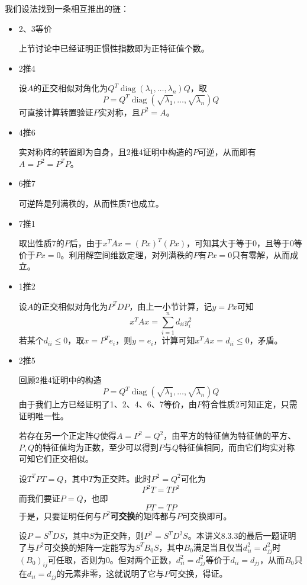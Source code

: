 \documentclass[a4paper,UTF8,fontset=windows]{ctexart}
\DeclareMathOperator{\diag}{diag}
\begin{document}
我们设法找到一条相互推出的链：
\begin{itemize}
    \item 2、3等价
    
    上节讨论中已经证明正惯性指数即为正特征值个数。

    \item 2推4
    
    设$A$的正交相似对角化为$Q^T\diag(\lambda_1,\dots,\lambda_n)Q$，取
    $$P=Q^T\diag(\sqrt{\lambda_1},\dots,\sqrt{\lambda_n})Q$$
    可直接计算转置验证$P$实对称，且$P^2=A$。

    \item 4推6
    
    实对称阵的转置即为自身，且2推4证明中构造的$P$可逆，从而即有$A=P^2=P^TP$。

    \item 6推7
    
    可逆阵是列满秩的，从而性质7也成立。

    \item 7推1

    取出性质7的$P$后，由于$x^TAx=(Px)^T(Px)$，可知其大于等于0，且等于0等价于$Px=0$。利用解空间维数定理，对列满秩的$P$有$Px=0$只有零解，从而成立。

    \item 1推2

    设$A$的正交相似对角化为$P^TDP$，由上一小节计算，记$y=Px$可知
    $$x^TAx=\sum_{i=1}^nd_{ii}y_i^2$$
    若某个$d_{ii}\le0$，取$x=P^Te_i$，则$y=e_i$，计算可知$x^TAx=d_{ii}\le0$，矛盾。

    \item 2推5
    
    回顾2推4证明中的构造
    $$P=Q^T\diag(\sqrt{\lambda_1},\dots,\sqrt{\lambda_n})Q$$
    由于我们上方已经证明了1、2、4、6、7等价，由$P$符合性质2可知正定，只需证明唯一性。

    若存在另一个正定阵$Q$使得$A=P^2=Q^2$，由平方的特征值为特征值的平方、$P,Q$的特征值均为正数，至少可以得到$P$与$Q$特征值相同，而由它们均实对称可知它们正交相似。

    设$T^TPT=Q$，其中$T$为正交阵。此时$P^2=Q^2$可化为
    $$P^2T=TP^2$$
    而我们要证$P=Q$，也即
    $$PT=TP$$
    于是，只要证明任何与$P^2$\textbf{可交换}的矩阵都与$P$可交换即可。

    设$P=S^TDS$，其中$S$为正交阵，则$P^2=S^TD^2S$。本讲义8.3.3的最后一题证明了与$P^2$可交换的矩阵一定能写为$S^TB_0S$，其中$B_0$满足当且仅当$d_{ii}^2=d_{jj}^2$时$(B_0)_{ij}$可任取，否则为0。但对两个正数，$d_{ii}^2=d_{jj}^2$等价于$d_{ii}=d_{jj}$，从而$B_0$只在$d_{ii}=d_{jj}$的元素非零，这就说明了它与$P$可交换，得证。


\end{itemize}
\end{document}
